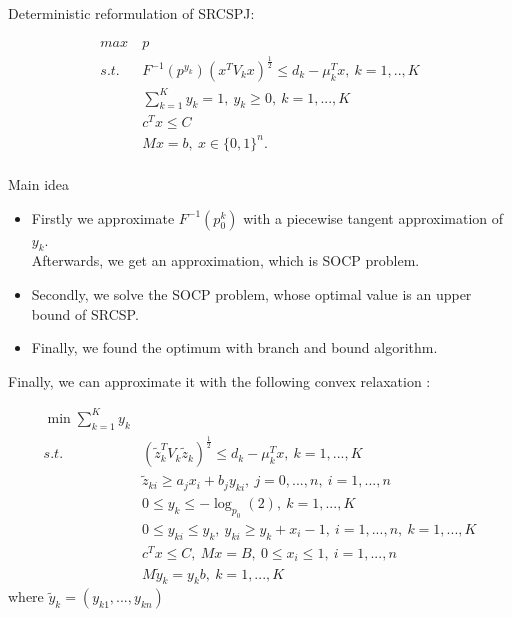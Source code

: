 \documentclass{beamer}
\begin{document}
\begin{frame}

Deterministic reformulation of SRCSPJ:

\begin{align*}
	max\ & p\\
	s.t.\ & F^{-1}(p^{y_k})(x^TV_kx)^{\frac{1}{2}} \leq d_k - \mu_k^Tx,\ k=1,..,K \\
	& \sum_{k=1}^K{y_k} = 1,\ y_k \geq 0,\ k=1, ..., K \\
	& c^T x \leq C \\
	& Mx = b,\ x \in \{0, 1\}^n.\\
\end{align*}
\end{frame}

\begin{frame}
	\begin{block}{Main idea}
		\begin{itemize}
			\pause
			\item Firstly we approximate $F^{-1}(p_0^{k})$ with a piecewise tangent approximation of $y_k$. \\
			Afterwards, we get an approximation, which is SOCP problem.
			\pause
			\item Secondly, we solve the SOCP problem, whose optimal value is an upper bound
			of SRCSP.
			\pause
			\item Finally, we found the optimum with branch and bound algorithm.
		\end{itemize}
	\end{block}
\end{frame}

\begin{frame}
	Finally, we can approximate it with the following convex relaxation :

\begin{align*}
\min{\sum_{k=1}^K{y_k}}\\
 s.t.\ & (\tilde{z}_k^TV_k\tilde{z}_k)^\frac{1}{2} \leq d_k - \mu_k^Tx,\ k=1, ..., K \\
	& \tilde{z}_{ki} \geq a_jx_i +b_jy_{ki},\ j = 0, ..., n,\ i = 1, ..., n \\
	& 0 \leq y_k \leq - \log_{p_0}{(2)},\ k = 1, ..., K \\
	& 0 \leq y_{ki} \leq y_k,\ y_{ki} \geq y_k + x_i - 1,\ i =  1, ..., n,\ k = 1, ..., K \\
	& c^Tx \leq C,\ Mx = B,\ 0 \leq x_i \leq 1,\ i=1, ..., n  \\
	& M\tilde{y}_k = y_kb,\ k = 1, ..., K
\end{align*}
where $\tilde{y}_k = (y_{k1} , . . . , y_{kn})$
\end{frame}
\end{document}
